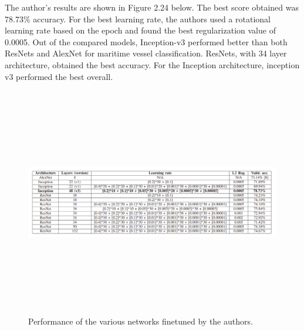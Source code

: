The author's results are shown in Figure 2.24 below. The best score obtained was
78.73\% accuracy. For the best learning rate, the authors used a rotational learning rate based on the epoch and found the best regularization value of 0.0005. Out of the compared models, Inception-v3 performed better than both ResNets and AlexNet for maritime vessel classification. ResNets, with 34 layer architecture, obtained the best accuracy. For the Inception architecture, inception v3 performed the best overall. 
\begin{figure}[H]
    \centering
    \includegraphics[width=\textwidth,height=10cm,keepaspectratio=true]{src/Images/leclerc_res.png}
    \caption{Performance of the various networks finetuned by the authors. \cite{leclerc2018ship}
     }
\end{figure}
\\